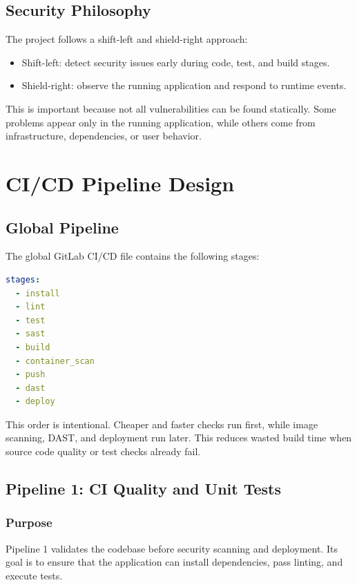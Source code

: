 \documentclass[12pt,a4paper]{report}
\begin{document}
\section{Security Philosophy}

The project follows a shift-left and shield-right approach:

\begin{itemize}[leftmargin=*]
    \item Shift-left: detect security issues early during code, test, and build stages.
    \item Shield-right: observe the running application and respond to runtime events.
\end{itemize}

This is important because not all vulnerabilities can be found statically. Some problems appear only in the running application, while others come from infrastructure, dependencies, or user behavior.

\chapter{CI/CD Pipeline Design}

\section{Global Pipeline}

The global GitLab CI/CD file contains the following stages:

\begin{lstlisting}[language=yaml,caption={Global pipeline stages}]
stages:
  - install
  - lint
  - test
  - sast
  - build
  - container_scan
  - push
  - dast
  - deploy
\end{lstlisting}

This order is intentional. Cheaper and faster checks run first, while image scanning, DAST, and deployment run later. This reduces wasted build time when source code quality or test checks already fail.

\section{Pipeline 1: CI Quality and Unit Tests}

\subsection{Purpose}

Pipeline 1 validates the codebase before security scanning and deployment. Its goal is to ensure that the application can install dependencies, pass linting, and execute tests.
\end{document}
